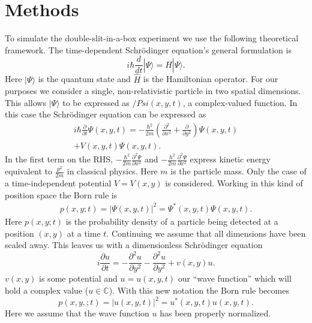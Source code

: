 \documentclass[english,notitlepage,reprint,nofootinbib]{revtex4-1}  %
\begin{document}
\section{Methods}\label{sec:methods}
%
To simulate the double-slit-in-a-box experiment we use the following theoretical framework. The time-dependent Schrödinger equation's general formulation is
\begin{equation}
    i \hbar \frac{d}{dt} | \Psi \rangle = \hat{H} | \Psi \rangle.
\end{equation}
Here $| \Psi \rangle$ is the quantum state and $\hat{H}$ is the Hamiltonian operator. For our purposes we consider a single, non-relativistic particle in two spatial dimensions. This allows $| \Psi \rangle$ to be expressed as $/Psi(x,y,t)$, a complex-valued function. In this case the Schrödinger equation can be expressed as
\begin{align}
    i \hbar \frac{\partial}{\partial t} \Psi(x,y,t) = - \frac{\hbar^2}{2m} \left( \frac{\partial^2}{\partial x^2} + \frac{\partial}{\partial y^2}\right) \Psi(x,y,t) \\
    + V(x,y,t) \Psi (x,y,t).
\end{align}
In the first term on the RHS, $- \frac{\hbar^2}{2m} \frac{\partial^2 \Psi}{\partial x^2}$ and $- \frac{\hbar^2}{2m} \frac{\partial^2 \Psi}{\partial x^2}$ express kinetic energy equivalent to $\frac{p^2}{2m}$ in classical physics. Here $m$ is the particle mass. Only the case of a time-independent potential $V = V(x,y)$ is considered. Working in this kind of position space the Born rule is
\begin{align}
    p(x,y;t) = |\Psi(x,y,t)|^2 = \Psi^{\ast} (x,y,t) \Psi(x,y,t).
\end{align}
Here $p(x,y;t)$ is the probability density of a particle being detected at a position $(x,y)$ at a time $t$. Continuing we assume that all dimensions have been scaled away. This leaves us with a dimensionless Schrödinger equation
\begin{equation}
    i \frac{\partial u}{\partial t} = - \frac{\partial^2 u}{\partial y^2} - \frac{\partial^2 u}{\partial y^2} + v(x,y)u. \label{eq:wave_eq}
\end{equation}
$v(x,y)$ is some potential and $u = u(x,y,t)$ our ``wave function'' which will hold a complex value ($u \in \mathbb{C}$). With this new notation the Born rule becomes
\begin{equation}
    p(x,y,;t) = |u(x,y,t)|^2 = u^{\ast} (x,y,t) u(x,y,t).
\end{equation}
Here we assume that the wave function $u$ has been properly normalized.
\end{document}
